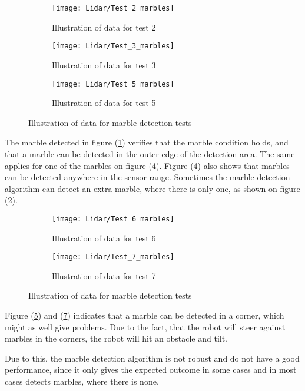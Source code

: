 \documentclass[../Head/Main.tex]{subfiles}
\begin{document}
\begin{figure}[H]
  \begin{subfigure}[b]{0.3\textwidth}
  	\centering
    \texttt{[image: Lidar/Test\_2\_marbles]}
    \caption{Illustration of data for test 2}
    \label{fig:MarbleTest2}
  \end{subfigure}
  \hfill
  \begin{subfigure}[b]{0.3\textwidth}
  	\centering
    \texttt{[image: Lidar/Test\_3\_marbles]}
    \caption{Illustration of data for test 3}
    \label{fig:MarbleTest3}
  \end{subfigure}
  \hfill
  \begin{subfigure}[b]{0.3\textwidth}
    \centering
    \texttt{[image: Lidar/Test\_5\_marbles]}
    \caption{Illustration of data for test 5}
    \label{fig:MarbleTest5}
  \end{subfigure}
  \caption{Illustration of data for marble detection tests}
\end{figure}
The marble detected in figure (\ref{fig:MarbleTest2}) verifies that the marble condition holds, and that a marble can be detected in the outer edge of the detection area. The same applies for one of the marbles on figure (\ref{fig:MarbleTest5}). Figure (\ref{fig:MarbleTest5}) also shows that marbles can be detected anywhere in the sensor range. Sometimes the marble detection algorithm can detect an extra marble, where there is only one, as shown on figure (\ref{fig:MarbleTest3}). 
\begin{figure}[H]
  \begin{subfigure}[b]{0.5\textwidth}
  	\centering
    \texttt{[image: Lidar/Test\_6\_marbles]}
    \caption{Illustration of data for test 6}
    \label{fig:MarbleTest6}
  \end{subfigure}
  \hfill
  \begin{subfigure}[b]{0.5\textwidth}
  	\centering
    \texttt{[image: Lidar/Test\_7\_marbles]}
    \caption{Illustration of data for test 7}
    \label{fig:MarbleTest7}
  \end{subfigure}
  \caption{Illustration of data for marble detection tests}
\end{figure}
Figure (\ref{fig:MarbleTest6}) and (\ref{fig:MarbleTest7}) indicates that a marble can be detected in a corner, which might as well give problems. Due to the fact, that the robot will steer against marbles in the corners, the robot will hit an obstacle and tilt.\par
Due to this, the marble detection algorithm is not robust and do not have a good performance, since it only gives the expected outcome in some cases and in most cases detects marbles, where there is none.
\end{document}
